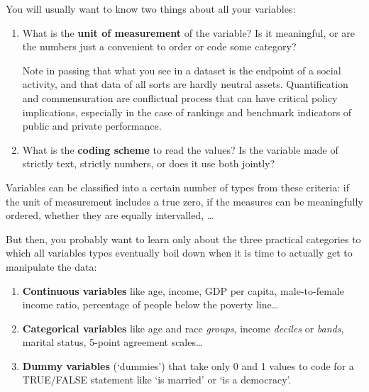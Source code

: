 You will usually want to know two things about all your variables:

\begin{enumerate}
	\item What is the \textbf{unit of measurement} of the variable? Is it meaningful, or are the numbers just a convenient to order or code some category?
	
Note in passing that what you see in a dataset is the endpoint of a social activity, and that data of all sorts are hardly neutral assets. Quantification and commensuration are conflictual process that can have critical policy implications, especially in the case of rankings and benchmark indicators of public and private performance.%

	\item What is the \textbf{coding scheme} to read the values? Is the variable made of strictly text, strictly numbers, or does it use both jointly?
\end{enumerate}

Variables can be classified into a certain number of types from these criteria: if the unit of measurement includes a true zero, if the measures can be meaningfully ordered, whether they are equally intervalled, …

But then, you probably want to learn only about the three practical categories to which all variables types eventually boil down when it is time to actually get to manipulate the data:

\begin{enumerate}
	\item \textbf{Continuous variables} like age, income, GDP per capita, male-to-female income ratio, percentage of people below the poverty line…
	\item \textbf{Categorical variables} like age and race \emph{groups}, income \emph{deciles} or \emph{bands}, marital status, 5-point agreement scales…
	\item \textbf{Dummy variables} (`dummies') that take only 0 and 1 values to code for a TRUE/FALSE statement like `is married' or `is a democracy'.
\end{enumerate}

